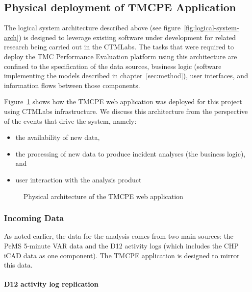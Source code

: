 \documentclass[12pt]{report}
\begin{document}
\subsection{Physical deployment of TMCPE Application}
\label{sec:arch}

The logical system architecture described above (see
figure~\ref{fig:logical-system-arch}) is designed to leverage existing software
under development for related research being carried out in the \ac{CTMLabs}.
The tasks that were required to deploy the \ac{TMC} Performance Evaluation
platform using this architecture are confined to the specification of the data
sources, business logic (software implementing the models described in
chapter~\ref{sec:method}), user interfaces, and information flows between those
components.

Figure~\ref{fig:physical-architecture} shows how the \ac{TMCPE} web application
was deployed for this project using \ac{CTMLabs} infrastructure.  We discuss
this architecture from the perspective of the events that drive the system,
namely:
\begin{itemize}
\item the availability of new data,
\item the processing of new data to produce incident analyses (the business
  logic), and
\item user interaction with the analysis product
\end{itemize}
\begin{figure}[t]
  \centering
  \caption{Physical architecture of the TMCPE web application}
  \label{fig:physical-architecture}
\end{figure}

\subsubsection{Incoming Data}
\label{sec:incoming-data}

As noted earlier, the data for the analysis comes from two main sources: the
\ac{PeMS} 5-minute \ac{VAR} data and the \ac{D12} activity logs (which includes
the \ac{CHP} \ac{iCAD} data as one component).  The \ac{TMCPE} application is
designed to mirror this data.  

\paragraph{D12 activity log replication}
\end{document}
